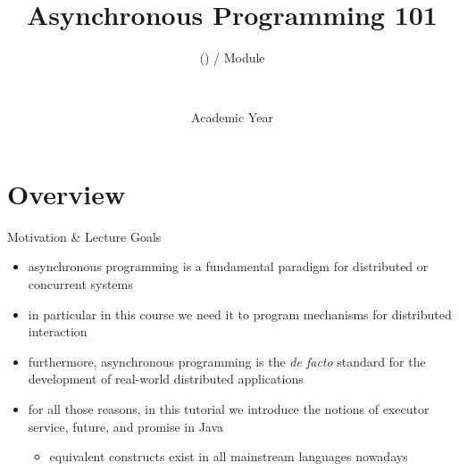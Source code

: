 \documentclass[presentation]{beamer}\mode<presentation>{\usetheme{AMSBolognaFC}}
\title[\currentLab{} -- Async 101]{
	Asynchronous Programming 101
}
\subtitle{\courseName{} (\courseAcronym) / Module \moduleN{}}
\author[\sspeaker{\gcShort} \& \mmShort]{
	\speaker{\gcFull} \and \mmFull
	\\ 
	\gcEmail \and \mmEmail
}
\institute[\disiShort, \uniboShort]{\disi{} (\disiShort)\\\unibo}
\date[A.Y. \academicYear{}]{Academic Year \academicYear{}}
\begin{document}
\frame{\titlepage}

\section{Overview}

\begin{frame}[c]{Motivation \& Lecture Goals}

\begin{itemize}
	\item asynchronous programming is a fundamental paradigm for distributed or concurrent systems

	\vfill

	\item in particular in this course we need it to program mechanisms for distributed interaction

	\vfill

	\item furthermore, asynchronous programming is the \emph{de facto} standard for the development of real-world distributed applications

	\vfill

	\item for all those reasons, in this tutorial we introduce the notions of \alert{executor service}, \alert{future}, and \alert{promise} in Java
	\begin{itemize}
		\item equivalent constructs exist in all mainstream languages nowadays
	\end{itemize}
\end{itemize}

\end{frame}
\end{document}
